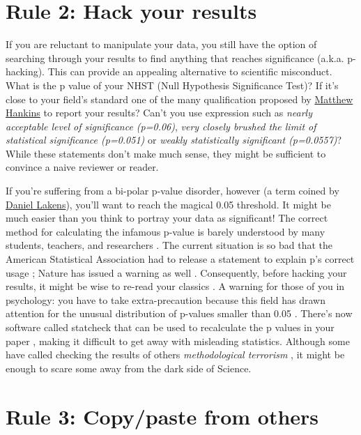 \documentclass[a4paper,10pt,onecolumn]{article}
\begin{document}
\section*{Rule 2: Hack your results}

If you are reluctant to manipulate your data, you still have the option of
searching through your results to find anything that reaches significance 
(a.k.a. p-hacking). This can provide an appealing alternative to scientific misconduct. What is the p value of your NHST (Null Hypothesis
Significance Test)? If it's close to your field's standard one of the many qualification
proposed by
\href{https://mchankins.wordpress.com/2013/04/21/still-not-significant-2/}{Matthew
  Hankins} to report your results? Can't you use expression such as {\em nearly
  acceptable level of significance (p=0.06)}, {\em very closely brushed the
  limit of statistical significance (p=0.051)} or {\em weakly statistically
  significant (p=0.0557)}? While these statements don't make much sense, they might
be sufficient to convince a naive reviewer or reader. 


If you're
suffering from a bi-polar p-value disorder, however (a term coined by
\href{http://daniellakens.blogspot.fr/2014/05/the-probability-of-p-values-as-function.html}{Daniel
  Lakens}), you'll want to reach the magical 0.05 threshold. It might be much easier than you think to portray your data as significant! The correct method for calculating the
infamous p-value is barely understood by many students, teachers, and
researchers \citep{haller:2002,lecoutre:2003}. The current situation is so bad that the American Statistical Association had to release a
statement to explain p's correct usage \citep{wasserstein:2016,};
Nature has issued a warning as well
\citep{baker:2016}. Consequently, before hacking your results, it might be wise
to re-read your classics
\citep{simmons:2011,cumming:2012a,cumming:2012b,colquhoun:2014}. A warning for those of you in psychology: you have to take extra-precaution because this field has drawn attention for the unusual distribution of
p-values smaller than 0.05 \citep{hartgerink:2016,bakker:2012}. There's now software called statcheck that can be used to recalculate the p values in your paper \citep{nuijten:2015,epskamp:2016}, making it difficult to get away with misleading statistics. Although some have called checking the results of others {\em
  methodological terrorism} \citep{finske:2016}, it might be enough to scare some away from the dark side of Science.


\section*{Rule 3: Copy/paste from others}
\end{document}
